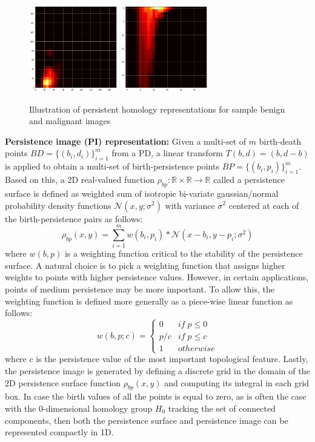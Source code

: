 \documentclass{article}
\begin{document}
\begin{figure}[t]
\includegraphics[height=1.5in]{figures/train_11_pi.png}
\includegraphics[height=1.5in]{figures/train_11_pl.png}
\caption{Illustration of persistent homology representations for sample benign and malignant images}
\label{fig:method_illustration}
\end{figure}
%

\smallskip
\noindent \textbf{Persistence image (PI) representation:} Given a multi-set of $m$ birth-death points $BD=\{(b_i, d_i)\}_{i=1}^{m}$ from a PD, a linear transform $T(b, d) = (b, d-b)$ is applied to obtain a multi-set of birth-persistence points $BP=\{(b_i, p_i)\}_{i=1}^{m}$. Based on this, a 2D real-valued function $\rho_{bp} : \mathbb{R} \times \mathbb{R} \to \mathbb{R}$ called a persistence surface is defined as weighted sum of isotropic bi-variate gaussian/normal probability density functions $\mathcal{N}\left(x, y; \sigma^2\right)$ with variance $\sigma^2$ centered at each of the birth-persistence pairs as follows:
\begin{equation}
\rho_{bp}(x, y) = \sum_{i=1}^{m} w(b_i,p_i) * \mathcal{N}\left(x - b_i, y - p_i; \sigma^{2}\right)
\end{equation}
where $w(b, p)$ is a weighting function critical to the stability of the persistence surface. A natural choice is to pick a weighting function that assigns higher weights to points with higher persistence values. However, in certain applications, points of medium persistence may be more important. To allow this, the weighting function is defined more generally as a piece-wise linear function as follows:
\begin{equation}
w(b, p; c) = \left\{\begin{array}{ll}
 0 & if \; p \leq 0\\ 
 p / c & if \; p \leq c\\ 
 1 & otherwise
\end{array}\right.    
\end{equation}
where $c$ is the persistence value of the most important topological feature. Lastly, the persistence image is generated by defining a discrete grid in the domain of the 2D persistence surface function $\rho_{bp}(x, y)$ and computing its integral in each grid box. In case the birth values of all the points is equal to zero, as is often the case with the 0-dimensional homology group $H_0$ tracking the set of connected components, then both the persistence surface and persistence image can be represented compactly in 1D.  
\end{document}
